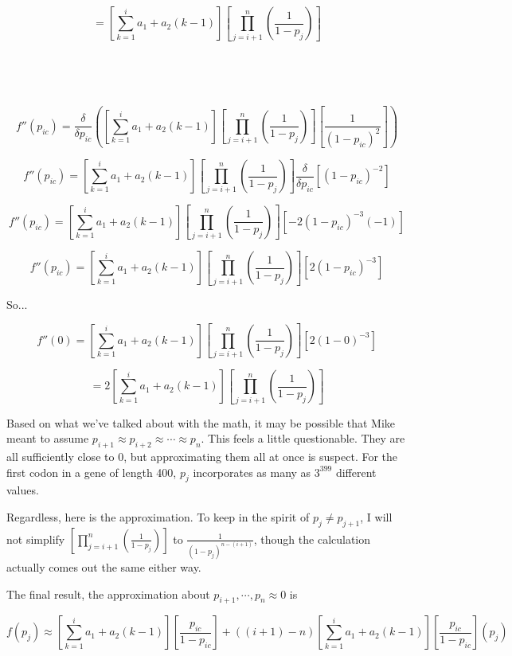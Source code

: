 \documentclass[11pt]{article} %
\begin{document}
$$=
\left[\sum_{k=1}^{i} a_1 + a_2(k-1)\right]
\left[\prod_{j=i+1}^{n}(\frac{1}{1-p_{j}})\right]
$$

~

\noindent\makebox[\linewidth]{\rule{\textwidth}{1pt}} 

~

$$f''(p_{ic})=
\frac{\delta}{\delta p_{ic}}\left(
\left[\sum_{k=1}^{i} a_1 + a_2(k-1)\right]
\left[\prod_{j=i+1}^{n}(\frac{1}{1-p_{j}})\right]
\left[\frac{1}
{(1-p_{ic})^2}\right]
\right)
$$


$$f''(p_{ic})=
\left[\sum_{k=1}^{i} a_1 + a_2(k-1)\right]
\left[\prod_{j=i+1}^{n}(\frac{1}{1-p_{j}})\right]
\frac{\delta}{\delta p_{ic}}
\left[
(1-p_{ic})^{-2}
\right]
$$

$$f''(p_{ic})=
\left[\sum_{k=1}^{i} a_1 + a_2(k-1)\right]
\left[\prod_{j=i+1}^{n}(\frac{1}{1-p_{j}})\right]
\left[
-2 (1-p_{ic})^{-3} (-1)
\right]
$$

$$f''(p_{ic})=
\left[\sum_{k=1}^{i} a_1 + a_2(k-1)\right]
\left[\prod_{j=i+1}^{n}(\frac{1}{1-p_{j}})\right]
\left[
2 (1-p_{ic})^{-3}
\right]
$$

So...

$$f''(0)=
\left[\sum_{k=1}^{i} a_1 + a_2(k-1)\right]
\left[\prod_{j=i+1}^{n}(\frac{1}{1-p_{j}})\right]
\left[
2 (1-0)^{-3}
\right]
$$

$$=
2
\left[\sum_{k=1}^{i} a_1 + a_2(k-1)\right]
\left[\prod_{j=i+1}^{n}(\frac{1}{1-p_{j}})\right]
$$



\newpage


Based on what we've talked about with the math, it may be possible that Mike meant to assume $p_{i+1} \approx p_{i+2} \approx \cdots \approx p_{n}$. This feels a little questionable. They are all sufficiently close to 0, but approximating them all at once is suspect. For the first codon in a gene of length 400, $p_j$ incorporates as many as $3^{399}$ different values.

Regardless, here is the approximation. To keep in the spirit of $p_{j} \neq p_{j+1}$, I will not simplify $\left[\prod_{j=i+1}^{n}(\frac{1}{1-p_{j}})\right]$ to $\frac{1}{(1-p_{j})^{n-(i+1)}}$, though the calculation actually comes out the same either way.

The final result, the approximation about $p_{i+1}, \cdots, p_n \approx 0$ is

$$
f(p_j) \approx
\left[\sum_{k=1}^{i} a_1 + a_2(k-1)\right]
\left[\frac{p_{ic}}{1-p_{ic}}\right]
+
\left( (i+1) - n \right)
\left[\sum_{k=1}^{i} a_1 + a_2(k-1)\right]
\left[\frac{p_{ic}}{1-p_{ic}}\right]
\left( p_{j} \right)
$$
\end{document}
